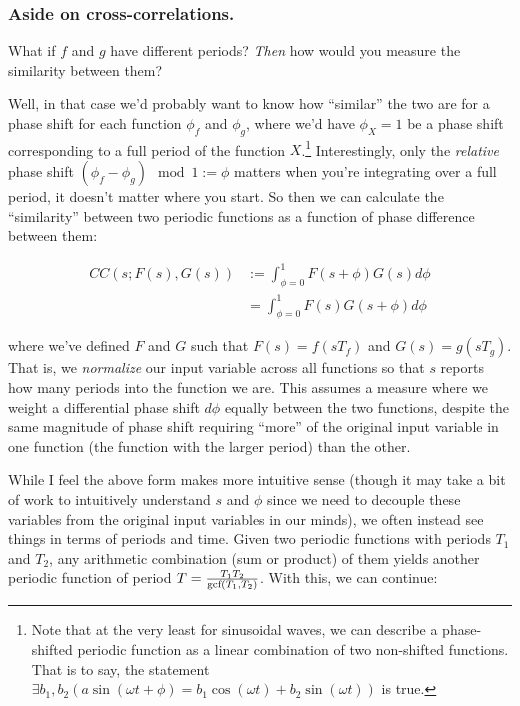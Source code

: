 \documentclass[letterpaper,12pt]{report}
\begin{document}
\subsubsection{Aside on cross-correlations.}

What if \(f\) and \(g\) have different periods? 
\emph{Then} how would you measure the similarity between them?\par
Well, in that case we'd probably want to know how ``similar''
the two are for a phase shift for each function \(\phi_f\) and \(\phi_g\),
where we'd have \(\phi_X = 1\) be a phase shift corresponding to a full
period of the function \(X\).\footnote
{
  Note that at the very least for sinusoidal waves, we can
  describe a phase-shifted periodic function as a linear combination
  of two non-shifted functions. That is to say, the statement
  \(\exists b_1, b_2 \left(a\sin(\omega t + \phi) = b_1\cos(\omega t) + b_2\sin(\omega t)\right)\) is true.
}
Interestingly, only the \emph{relative} phase shift 
\(\left(\phi_f - \phi_g\right) \mod 1 := \phi \)
matters \textemdash{} when you're integrating over a full period,
it doesn't matter where you start.
So then we can calculate the ``similarity'' between two periodic
functions as a function of phase difference between them:

\[ \begin{split}
  CC(s; F(s), G(s)) &:= 
    \int_{\phi = 0}^{1} F(s + \phi) G(s) d\phi \\
    &= \int_{\phi = 0}^{1} F(s) G(s + \phi) d\phi
\end{split}
\]

where we've defined \(F\) and \(G\) such that 
\(F(s) = f(sT_f)\)
and
\(G(s) = g(sT_g)\). That is, we \emph{normalize} our input variable
across all functions so that \(s\) reports how many periods into
the function we are. 
This assumes a measure where we weight a differential phase shift
\(d\phi\) equally between the two functions, despite the same
magnitude of phase shift requiring ``more'' of the original
input variable in one function (the function with the larger period)
than the other.\par

While I feel the above form makes more intuitive sense (though
it may take a bit of work to intuitively understand \(s\) and \(\phi\) since
we need to decouple these variables from the original input variables
in our minds), 
we often
instead see things in terms of periods and time.
Given two periodic functions with periods \(T_1\) and \(T_2\),
any arithmetic combination (sum or product) of them yields
another periodic function of period \(T = \frac{T_1 T_2}{\text{gcf}\left(T_1, T_2\right)}\). With this, we can continue:
\end{document}
